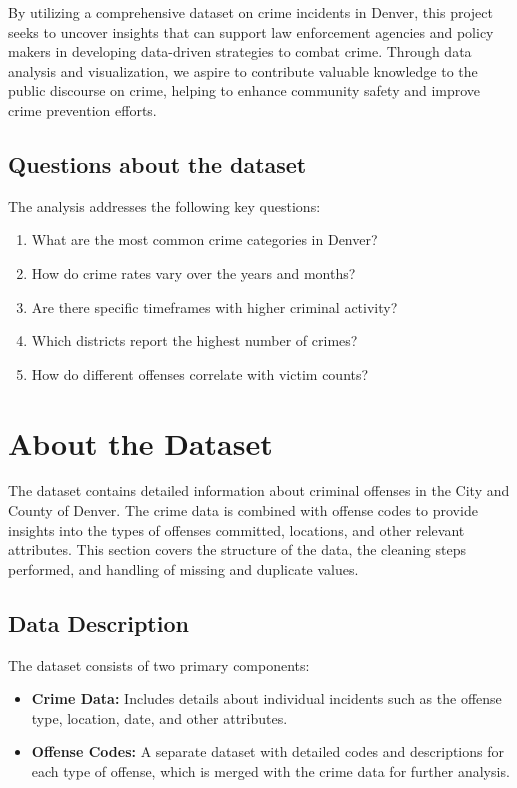 \documentclass{article}
\begin{document}
By utilizing a comprehensive dataset on crime incidents in Denver, this project seeks to uncover insights that can support law enforcement agencies and policy makers in developing data-driven strategies to combat crime. Through data analysis and visualization, we aspire to contribute valuable knowledge to the public discourse on crime, helping to enhance community safety and improve crime prevention efforts.


\subsection{Questions about the dataset}
The analysis addresses the following key questions:
\begin{enumerate}
    \item What are the most common crime categories in Denver?
    \item How do crime rates vary over the years and months?
    \item Are there specific timeframes with higher criminal activity?
    \item Which districts report the highest number of crimes?
    \item How do different offenses correlate with victim counts?
\end{enumerate}

\section{About the Dataset}

The dataset contains detailed information about criminal offenses in the City and County of Denver. The crime data is combined with offense codes to provide insights into the types of offenses committed, locations, and other relevant attributes. This section covers the structure of the data, the cleaning steps performed, and handling of missing and duplicate values.

\subsection{Data Description}

The dataset consists of two primary components:
\begin{itemize}
    \item \textbf{Crime Data:} Includes details about individual incidents such as the offense type, location, date, and other attributes. 
    \item \textbf{Offense Codes:} A separate dataset with detailed codes and descriptions for each type of offense, which is merged with the crime data for further analysis.
\end{itemize}
\end{document}

